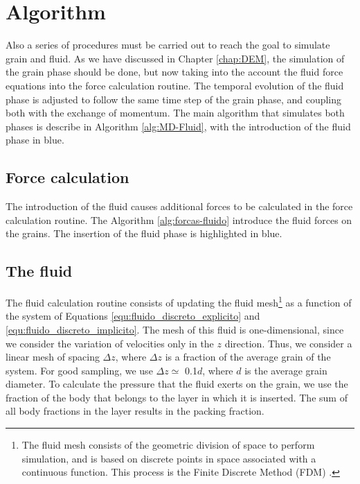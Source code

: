 \section{Algorithm}
    Also a series of procedures must be carried out to reach the goal to simulate grain and fluid. As we have discussed in Chapter \ref{chap:DEM}, the simulation of the grain phase should be done, but now taking into the account the fluid force equations into the force calculation routine. The temporal evolution of the fluid phase is adjusted to follow the same time step of the grain phase, and coupling both with the exchange of momentum. The main algorithm that simulates both phases is describe in Algorithm \ref{alg:MD-Fluid}, with the introduction of the fluid phase in blue.



\subsection{Force calculation}
    The introduction of the fluid causes additional forces to be calculated in the force calculation routine. The Algorithm \ref{alg:forcas-fluido} introduce the fluid forces on the grains. The insertion of the fluid phase is highlighted in blue.



\subsection{The fluid}
    The fluid calculation routine consists of updating the fluid mesh\footnote{The fluid mesh consists of the geometric division of space to perform simulation, and is based on discrete points in space associated with a continuous function. This process is the Finite Discrete Method (FDM) \cite{Numerical_Heat_Transfer_and_Fluid_Flow}.} as a function of the system of Equations \ref{equ:fluido_discreto_explicito} and \ref{equ:fluido_discreto_implicito}. The mesh of this fluid is one-dimensional, since we consider the variation of velocities only in the $z$ direction. Thus, we consider a linear mesh of spacing $\Delta z$, where $\Delta z$ is a fraction of the average grain of the system. For good sampling, we use $\Delta z \simeq$ 0.1$d$, where $d$ is the average grain diameter. To calculate the pressure that the fluid exerts on the grain, we use the fraction of the body that belongs to the layer in which it is inserted. The sum of all body fractions in the layer results in the packing fraction.

